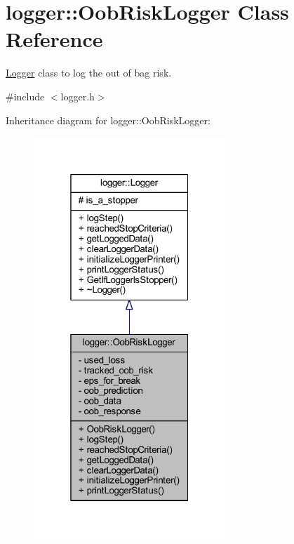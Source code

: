 \hypertarget{classlogger_1_1_oob_risk_logger}{}\section{logger\+:\+:Oob\+Risk\+Logger Class Reference}
\label{classlogger_1_1_oob_risk_logger}


\mbox{\hyperlink{classlogger_1_1_logger}{Logger}} class to log the out of bag risk.  




{\ttfamily \#include $<$logger.\+h$>$}



Inheritance diagram for logger\+:\+:Oob\+Risk\+Logger\+:
\nopagebreak
\begin{figure}[H]
\begin{center}
\leavevmode
\includegraphics[width=205pt]{classlogger_1_1_oob_risk_logger__inherit__graph}
\end{center}
\end{figure}


